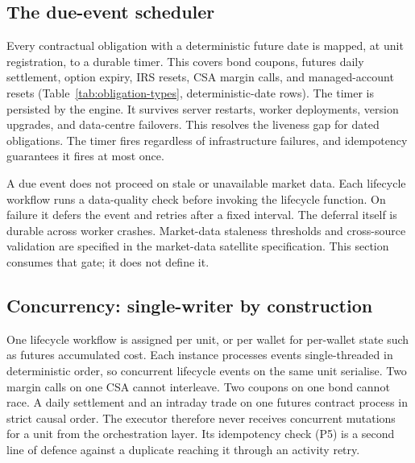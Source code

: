 \subsection{The due-event scheduler}
\label{sec:temporal-scheduler}

Every contractual obligation with a deterministic future date is mapped, at unit registration, to a durable timer. This covers bond coupons, futures daily settlement, option expiry, IRS resets, CSA margin calls, and managed-account resets (Table~\ref{tab:obligation-types}, deterministic-date rows). The timer is persisted by the engine. It survives server restarts, worker deployments, version upgrades, and data-centre failovers. This resolves the liveness gap for dated obligations. The timer fires regardless of infrastructure failures, and idempotency guarantees it fires at most once.

A due event does not proceed on stale or unavailable market data. Each lifecycle workflow runs a data-quality check before invoking the lifecycle function. On failure it defers the event and retries after a fixed interval. The deferral itself is durable across worker crashes. Market-data staleness thresholds and cross-source validation are specified in the market-data satellite specification. This section consumes that gate; it does not define it.

\subsection{Concurrency: single-writer by construction}
\label{sec:temporal-concurrency}

One lifecycle workflow is assigned per unit, or per wallet for per-wallet state such as futures accumulated cost. Each instance processes events single-threaded in deterministic order, so concurrent lifecycle events on the same unit serialise. Two margin calls on one CSA cannot interleave. Two coupons on one bond cannot race. A daily settlement and an intraday trade on one futures contract process in strict causal order. The executor therefore never receives concurrent mutations for a unit from the orchestration layer. Its idempotency check (P5) is a second line of defence against a duplicate reaching it through an activity retry.

